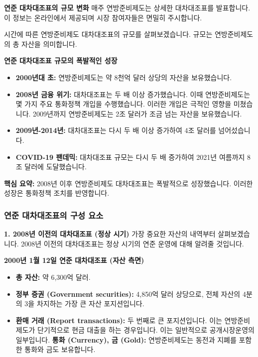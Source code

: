 \documentclass[11pt,a4paper]{article}
\theoremstyle{definition}
\begin{document}
\textbf{연준 대차대조표의 규모 변화}
매주 연방준비제도는 상세한 대차대조표를 발표합니다. 이 정보는 온라인에서 제공되며 시장 참여자들은 면밀히 주시합니다.

시간에 따른 연방준비제도 대차대조표의 규모를 살펴보겠습니다. 규모는 연방준비제도의 총 자산을 의미합니다.

\begin{examplebox}
\textbf{연준 대차대조표 규모의 폭발적인 성장}
\begin{itemize}
    \item \textbf{2000년대 초:} 연방준비제도는 약 8천억 달러 상당의 자산을 보유했습니다.
    \item \textbf{2008년 금융 위기:} 대차대조표는 두 배 이상 증가했습니다. 이때 연방준비제도는 몇 가지 주요 통화정책 개입을 수행했습니다. 이러한 개입은 극적인 영향을 미쳤습니다. 2009년까지 연방준비제도는 2조 달러가 조금 넘는 자산을 보유했습니다.
    \item \textbf{2009년-2014년:} 대차대조표는 다시 두 배 이상 증가하여 4조 달러를 넘어섰습니다.
    \item \textbf{COVID-19 팬데믹:} 대차대조표 규모는 다시 두 배 증가하여 2021년 여름까지 8조 달러에 도달했습니다.
\end{itemize}
\textbf{핵심 요약:} 2008년 이후 연방준비제도 대차대조표는 폭발적으로 성장했습니다. 이러한 성장은 통화정책 조치를 반영합니다.
\end{examplebox}

\subsubsection*{연준 대차대조표의 구성 요소}

\textbf{1. 2008년 이전의 대차대조표 (정상 시기)}
가장 중요한 자산의 내역부터 살펴보겠습니다. 2008년 이전의 대차대조표는 정상 시기의 연준 운영에 대해 알려줄 것입니다.

\begin{examplebox}
\textbf{2000년 1월 12일 연준 대차대조표 (자산 측면)}
\begin{itemize}
    \item \textbf{총 자산:} 약 6,300억 달러.
    \item \textbf{정부 증권 (Government securities):} 4,850억 달러 상당으로, 전체 자산의 4분의 3을 차지하는 가장 큰 자산 포지션입니다.
    \item \textbf{환매 거래 (Report transactions):} 두 번째로 큰 포지션입니다. 이는 연방준비제도가 단기적으로 현금 대출을 하는 경우입니다. 이는 일반적으로 공개시장운영의 일부입니다.
    \textbf{통화 (Currency), 금 (Gold):} 연방준비제도는 동전과 지폐를 포함한 통화와 금도 보유합니다.
\end{itemize}
\end{examplebox}
\end{document}
